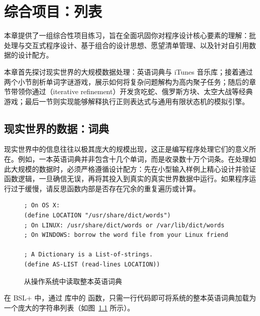 
\chapter{综合项目：列表}
\label{sec:ch12_projects}

本章提供了一组综合性项目练习，旨在全面巩固你对程序设计核心要素的理解：批处理与交互式程序设计、基于组合的设计思想、愿望清单管理、以及针对自引用数据的设计配方。

本章首先探讨现实世界的大规模数据处理：英语词典与 iTunes 音乐库；接着通过两个小节剖析单词字谜游戏，展示如何将复杂问题解构为高内聚子任务；随后的章节带领你通过（iterative refinement）开发贪吃蛇、俄罗斯方块、太空大战等经典游戏；最后一节则实现能够解释执行正则表达式与通用有限状态机的模拟引擎。

\section{现实世界的数据：词典}
\label{sec:ch12_dictionaries}

现实世界中的信息往往以极其庞大的规模出现，这正是编写程序处理它们的意义所在。例如，一本英语词典并非包含十几个单词，而是收录数十万个词条。在处理如此大规模的数据时，必须严格遵循设计配方：先在小型输入样例上精心设计并验证函数逻辑，一旦确信无误，再将其投入到真实的真实世界数据中运行。如果程序运行过于缓慢，请反思函数内部是否存在冗余的重复遍历或计算。

\begin{figure}[htbp]
  \centering
\begin{lstlisting}[language=BSL, basicstyle=\scriptsize\ttfamily]
; On OS X:
(define LOCATION "/usr/share/dict/words")
; On LINUX: /usr/share/dict/words or /var/lib/dict/words
; On WINDOWS: borrow the word file from your Linux friend

; A Dictionary is a List-of-strings.
(define AS-LIST (read-lines LOCATION))
\end{lstlisting}
  \caption{从操作系统中读取整本英语词典}
  \label{fig:reading_dictionary}
\end{figure}

在 BSL+ 中，通过  库中的  函数，只需一行代码即可将系统的整本英语词典加载为一个庞大的字符串列表（如图~\ref{fig:reading_dictionary} 所示）。

